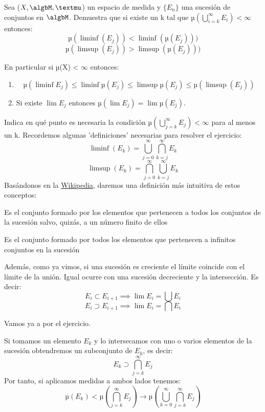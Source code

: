 \begin{problem}[6]
Sea ($X, \algbM, µ$) un espacio de medida y $\{E_n\} $ una sucesión de conjuntos en $\algbM$. Demuestra que si existe un k tal que $µ(\bigcup_{i=k}^{\infty}E_i) < \infty$ entonces:
\[µ(\liminf (E_j))<\liminf (µ(E_j)))\]
\[µ(\limsup (E_j))>\limsup (µ(E_j)))\]

En particular si µ(X) < $\infty$ entonces:
\begin{enumerate}
\item
\[µ(\liminf E_j) \leq \liminf µ(E_j) \leq \limsup µ(E_j) \leq µ(\limsup(E_j))\]
\item Si existe $\lim E_j$ entonces $µ(\lim E_j)=\lim µ(E_j)$.
\end{enumerate}
Indica en qué punto es necesaria la condición $µ(\bigcup_{j=k}^{\infty}E_j)< \infty$ para al menos un k.
\solution
Recordemos algunas 'definiciones' necesarias para resolver el ejercicio:
\[\liminf (E_k) = \bigcup_{j=0}^{\infty} \bigcap_{k=j}^{\infty} E_k\]
\[\limsup (E_k)= \bigcap_{j=0}^{\infty} \bigcup_{k=j}^{\infty} E_k\]
Basándonos en la \href{http://en.wikipedia.org/wiki/Limit_superior_and_limit_inferior}{Wikipedia}, daremos una definición más intuitiva de estos conceptos:

\begin{defn}
Es el conjunto formado por los elementos que pertenecen a todos los conjuntos de la sucesión salvo, quizás, a un número finito de ellos
\end{defn}

\begin{defn}
Es el conjunto formado por todos los elementos que pertenecen a infinitos conjuntos en la sucesión
\end{defn}

Además, como ya vimos, si una sucesión es creciente el límite coincide con el límite de la unión. Igual ocurre con una sucesión decreciente y la intersección. Es decir:
\[E_i \subset E_{i+1} \implies \lim E_i = \bigcup E_i\]
\[E_i \supset E_{i+1} \implies \lim E_i = \bigcap E_i\]


Vamos ya a por el ejercicio.

Si tomamos un elemento $E_k$ y lo intersecamos con uno o varios elementos de la sucesión obtendremos un subconjunto de $E_k$, es decir:
\[E_k \supset \bigcap_{j=k}^{\infty}E_j\]
Por tanto, si aplicamos medidas a ambos lados tenemos:
\[µ(E_k) < µ(\bigcap_{j=k}^{\infty}E_j) \rightarrow µ(\bigcup_{k=0}^{\infty}\bigcap_{j=k}^{\infty}E_j)\]


\end{problem}
